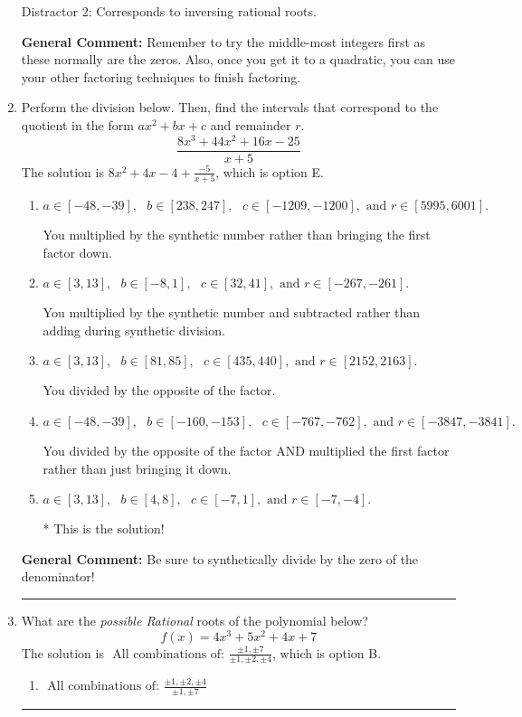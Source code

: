 \documentclass{extbook}[14pt]
\newcommand{\litem}[1]{\item #1

\rule{\textwidth}{0.4pt}}
\begin{document}
\begin{enumerate}
{\begin{enumerate}[label=\Alph*.]
 Distractor 2: Corresponds to inversing rational roots.
\end{enumerate}

\textbf{General Comment:} Remember to try the middle-most integers first as these normally are the zeros. Also, once you get it to a quadratic, you can use your other factoring techniques to finish factoring.
}
\litem{
Perform the division below. Then, find the intervals that correspond to the quotient in the form $ax^2+bx+c$ and remainder $r$.
\[ \frac{8x^{3} +44 x^{2} +16 x -25}{x + 5} \]The solution is \( 8x^{2} +4 x -4 + \frac{-5}{x + 5} \), which is option E.\begin{enumerate}[label=\Alph*.]
\item \( a \in [-48, -39], \text{   } b \in [238, 247], \text{   } c \in [-1209, -1200], \text{   and   } r \in [5995, 6001]. \)

 You multiplied by the synthetic number rather than bringing the first factor down.
\item \( a \in [3, 13], \text{   } b \in [-8, 1], \text{   } c \in [32, 41], \text{   and   } r \in [-267, -261]. \)

 You multiplied by the synthetic number and subtracted rather than adding during synthetic division.
\item \( a \in [3, 13], \text{   } b \in [81, 85], \text{   } c \in [435, 440], \text{   and   } r \in [2152, 2163]. \)

 You divided by the opposite of the factor.
\item \( a \in [-48, -39], \text{   } b \in [-160, -153], \text{   } c \in [-767, -762], \text{   and   } r \in [-3847, -3841]. \)

 You divided by the opposite of the factor AND multiplied the first factor rather than just bringing it down.
\item \( a \in [3, 13], \text{   } b \in [4, 8], \text{   } c \in [-7, 1], \text{   and   } r \in [-7, -4]. \)

* This is the solution!
\end{enumerate}

\textbf{General Comment:} Be sure to synthetically divide by the zero of the denominator!
}
\litem{
What are the \textit{possible Rational} roots of the polynomial below?
\[ f(x) = 4x^{3} +5 x^{2} +4 x + 7 \]The solution is \( \text{ All combinations of: }\frac{\pm 1,\pm 7}{\pm 1,\pm 2,\pm 4} \), which is option B.\begin{enumerate}[label=\Alph*.]
\item \( \text{ All combinations of: }\frac{\pm 1,\pm 2,\pm 4}{\pm 1,\pm 7} \)


\end{enumerate}}
\end{enumerate}
\end{document}
